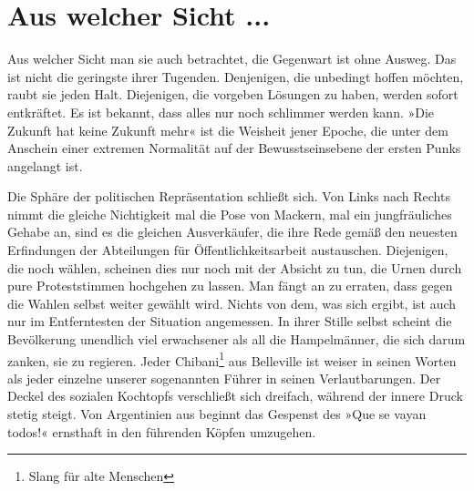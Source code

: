 \section{Aus welcher Sicht ...}

Aus welcher Sicht man sie auch betrachtet, die Gegenwart ist ohne
Ausweg. Das ist nicht die geringste ihrer Tugenden. Denjenigen, die
unbedingt hoffen möchten, raubt sie jeden Halt. Diejenigen, die
vorgeben Lösungen zu haben, werden sofort entkräftet. Es ist
bekannt, dass alles nur noch schlimmer werden kann. »Die Zukunft
hat keine Zukunft mehr« ist die Weisheit jener Epoche, die unter
dem Anschein einer extremen Normalität auf der Bewusstseinsebene
der ersten Punks angelangt ist.
\extrapar{}

Die Sphäre der politischen Repräsentation schließt sich. Von Links
nach Rechts nimmt die gleiche Nichtigkeit mal die Pose von Mackern,
mal ein jungfräuliches Gehabe an, sind es die gleichen
Ausverkäufer, die ihre Rede gemäß den neuesten Erfindungen der
Abteilungen für Öffentlichkeitsarbeit austauschen. Diejenigen, die
noch wählen, scheinen dies nur noch mit der Absicht zu tun, die
Urnen durch pure Proteststimmen hochgehen zu lassen. Man fängt an
zu erraten, dass gegen die Wahlen selbst weiter gewählt wird.
Nichts von dem, was sich ergibt, ist auch nur im Entferntesten der
Situation angemessen. In ihrer Stille selbst scheint die
Bevölkerung unendlich viel erwachsener als all die Hampelmänner,
die sich darum zanken, sie zu regieren. Jeder Chibani\footnote{
Slang für alte Menschen
}
aus
Belleville ist weiser in seinen Worten als jeder einzelne unserer
sogenannten Führer in seinen Verlautbarungen. Der Deckel des
sozialen Kochtopfs verschließt sich dreifach, während der innere
Druck stetig steigt. Von Argentinien aus beginnt das Gespenst des
»Que se vayan todos!« ernsthaft in den führenden Köpfen umzugehen.
\extrapar{}

